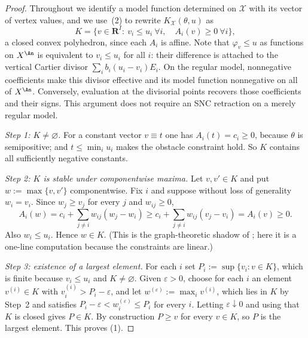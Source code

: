 \begin{proof}
Throughout we identify a model function determined on $\mathcal X$ with its
vector of vertex values, and we use \,(2)
to rewrite $K_{\mathcal X}(\theta,u)$ as
\begin{equation}\label{eq:ch23-curve-polyhedron}
 K=\{v\in\mathbf R^I:\ v_i\leq u_i\ \forall i,\quad
     A_i(v)\geq0\ \forall i\},
\end{equation}
a closed convex polyhedron, since each $A_i$ is affine.  Note that
$\varphi_v\leq u$ as functions on $X^{\An}$ is equivalent to
$v_i\leq u_i$ for all $i$: their difference is attached to the vertical Cartier divisor
$\sum_i b_i(u_i-v_i)E_i$.  On the regular model, nonnegative
coefficients make this divisor effective and its model function
nonnegative on all of $X^{\An}$.  Conversely, evaluation at the
divisorial points recovers those coefficients and their signs.  This
argument does not require an SNC retraction on a merely regular model.

\emph{Step 1: $K\ne\varnothing$.}  For a constant vector $v\equiv t$ one
has $A_i(t)=c_i\geq0$, because $\theta$ is semipositive; and
$t\leq\min_iu_i$ makes the obstacle constraint hold.  So
$K$ contains all sufficiently negative constants.

\emph{Step 2: $K$ is stable under componentwise maxima.}  Let
$v,v'\in K$ and put $w:=\max\{v,v'\}$ componentwise.  Fix $i$ and
suppose without loss of generality $w_i=v_i$.  Since $w_j\geq v_j$ for
every $j$ and $w_{ij}\geq0$,
\[
 A_i(w)=c_i+\sum_{j\ne i}w_{ij}(w_j-w_i)
       \geq c_i+\sum_{j\ne i}w_{ij}(v_j-v_i)
       =A_i(v)\geq0 .
\]
Also $w_i\leq u_i$.  Hence $w\in K$.  (This is the graph-theoretic
shadow of ; here it is a one-line computation
because the constraints are linear.)

\emph{Step 3: existence of a largest element.}  For each $i$ set
$P_i:=\sup\{v_i:v\in K\}$, which is finite because $v_i\leq u_i$ and
$K\ne\varnothing$.  Given $\varepsilon>0$, choose for each $i$ an
element $v^{(i)}\in K$ with $v^{(i)}_i>P_i-\varepsilon$, and let
$w^{(\varepsilon)}:=\max_iv^{(i)}$, which lies in $K$ by Step~2 and
satisfies $P_i-\varepsilon<w^{(\varepsilon)}_i\leq P_i$ for every $i$.
Letting $\varepsilon\downarrow0$ and using that $K$ is closed gives
$P\in K$.  By construction $P\geq v$ for every $v\in K$, so $P$ is
the largest element.  This proves (1).


\end{proof}
